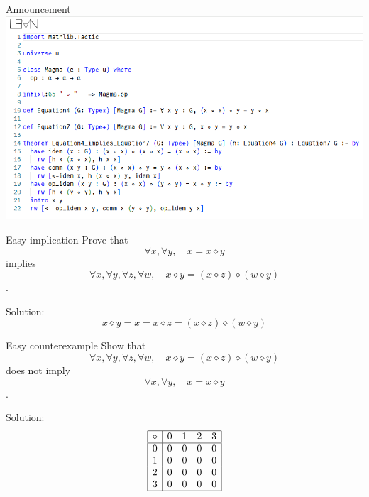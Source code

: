 \documentclass{beamer}
\newcommand{\op}{\diamond}
\begin{document}
\begin{frame}{Announcement}
\includegraphics[width=\textwidth]{initial_lean}
\end{frame}


\begin{frame}{Easy implication}
Prove that
$$ \forall x, \forall y,\quad x = x \op y $$
implies
$$ \forall x, \forall y, \forall z, \forall w,\quad x \op y = (x \op z) \op (w \op y) $$
.

\pause
Solution:
$$ x \op y = x = x \op z = (x \op z) \op (w \op y) $$
\end{frame}


\begin{frame}{Easy counterexample}
Show that
$$ \forall x, \forall y, \forall z, \forall w,\quad x \op y = (x \op z) \op (w \op y) $$
does not imply
$$ \forall x, \forall y,\quad x = x \op y $$
.

\pause
Solution:
$$
\begin{array}{ | c | c c c c | }
	\hline
	\op & 0 & 1 & 2 & 3 \\
	\hline
	0 & 0 & 0 & 0 & 0 \\ 
	1 & 0 & 0 & 0 & 0 \\ 
	2 & 0 & 0 & 0 & 0 \\ 
	3 & 0 & 0 & 0 & 0 \\ 
	\hline
\end{array}
$$

\end{frame}
\end{document}

